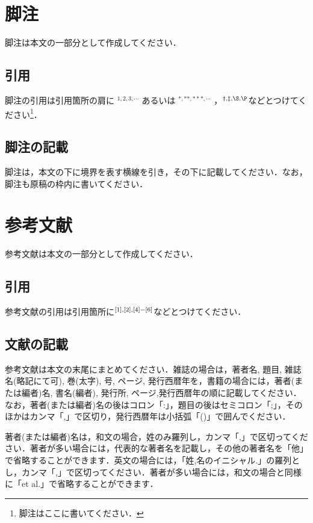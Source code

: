 \documentclass{hisken}
\begin{document}
\section{脚注}
脚注は本文の一部分として作成してください．

\subsection{引用}
脚注の引用は引用箇所の肩に $^ {1,2,3, \cdots} $ あるいは $^ {*,**,***,\cdots} $ ，$^ {\dag, \ddag, \S, \P} $などとつけてください\footnote{脚注はここに書いてください．}．

\subsection{脚注の記載}
脚注は，本文の下に境界を表す横線を引き，その下に記載してください．なお，脚注も原稿の枠内に書いてください．


\section{参考文献}
参考文献は本文の一部分として作成してください．

\subsection{引用}
参考文献の引用は引用箇所に$^ {\scriptsize [1],[2],[4]-[6]} $などとつけてください．

\subsection{文献の記載}
参考文献は本文の末尾にまとめてください．雑誌の場合は，著者名, 題目, 雑誌名(略記にて可), 巻(太字), 号, ページ, 発行西暦年を，書籍の場合には，著者(または編者)名, 書名(編者), 発行所, ページ,発行西暦年の順に記載してください．なお，著者(または編者)名の後はコロン「:」，題目の後はセミコロン「;」，そのほかはカンマ「,」で区切り，発行西暦年は小括弧「()」で囲んでください．

著者(または編者)名は，和文の場合，姓のみ羅列し，カンマ「,」で区切ってください．著者が多い場合には，代表的な著者名を記載し，その他の著者名を「他」で省略することができます．英文の場合には，「姓,名のイニシャル.」の羅列とし，カンマ「,」で区切ってください．著者が多い場合には，和文の場合と同様に「et al.」で省略することができます．\\
\end{document}
